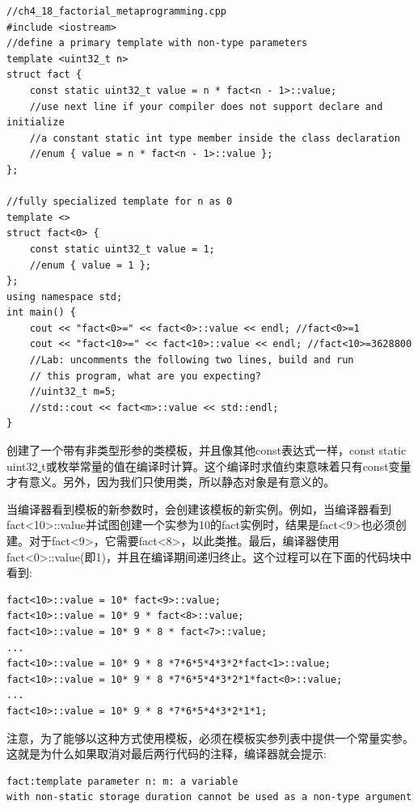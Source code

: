 \begin{lstlisting}[caption={}]
//ch4_18_factorial_metaprogramming.cpp
#include <iostream>
//define a primary template with non-type parameters
template <uint32_t n>
struct fact {
	const static uint32_t value = n * fact<n - 1>::value;
	//use next line if your compiler does not support declare and initialize
	//a constant static int type member inside the class declaration
	//enum { value = n * fact<n - 1>::value };
};

//fully specialized template for n as 0
template <>
struct fact<0> {
	const static uint32_t value = 1;
	//enum { value = 1 };
};
using namespace std;
int main() {
	cout << "fact<0>=" << fact<0>::value << endl; //fact<0>=1
	cout << "fact<10>=" << fact<10>::value << endl; //fact<10>=3628800
	//Lab: uncomments the following two lines, build and run
	// this program, what are you expecting?
	//uint32_t m=5;
	//std::cout << fact<m>::value << std::endl;
}
\end{lstlisting}

创建了一个带有非类型形参的类模板，并且像其他const表达式一样，const static uint32\underline{ }t或枚举常量的值在编译时计算。这个编译时求值约束意味着只有const变量才有意义。另外，因为我们只使用类，所以静态对象是有意义的。 \par
当编译器看到模板的新参数时，会创建该模板的新实例。例如，当编译器看到fact<10>::value并试图创建一个实参为10的fact实例时，结果是fact<9>也必须创建。对于fact<9>，它需要fact<8>，以此类推。最后，编译器使用fact<0>::value(即1)，并且在编译期间递归终止。这个过程可以在下面的代码块中看到:\par

\begin{lstlisting}[caption={}]
fact<10>::value = 10* fact<9>::value;
fact<10>::value = 10* 9 * fact<8>::value;
fact<10>::value = 10* 9 * 8 * fact<7>::value;
...
fact<10>::value = 10* 9 * 8 *7*6*5*4*3*2*fact<1>::value;
fact<10>::value = 10* 9 * 8 *7*6*5*4*3*2*1*fact<0>::value;
...
fact<10>::value = 10* 9 * 8 *7*6*5*4*3*2*1*1;
\end{lstlisting}

注意，为了能够以这种方式使用模板，必须在模板实参列表中提供一个常量实参。这就是为什么如果取消对最后两行代码的注释，编译器就会提示: \par

\begin{lstlisting}[caption={}]
fact:template parameter n: m: a variable
with non-static storage duration cannot be used as a non-type argument  \end{lstlisting}

